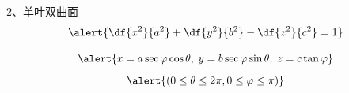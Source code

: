 \begin{frame}{2、单叶双曲面}
	\linespread{1.2}\pause 
	$$\alert{\df{x^2}{a^2}+\df{y^2}{b^2}-\df{z^2}{c^2}=1}$$\pause 
	\vspace{-1em}
	\begin{center}
 	\end{center}\pause 
 	$$\alert{x=a\sec\varphi\cos\theta,\;y=b\sec\varphi\sin\theta,\;z=c\tan\varphi}$$
 	$$\alert{(0\leq\theta\leq 2\pi,0\leq\varphi\leq\pi)}$$
\end{frame}

